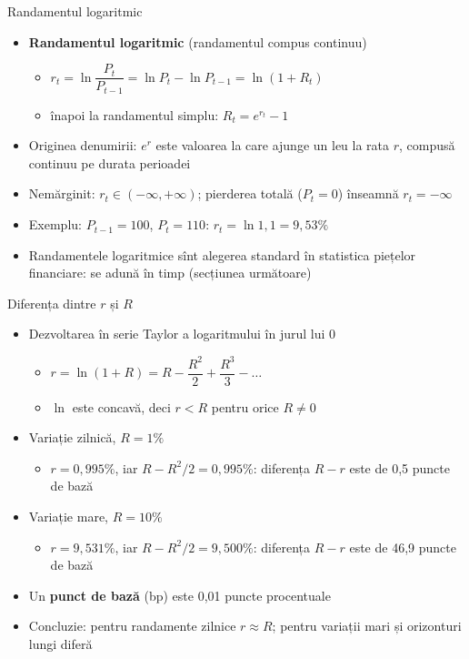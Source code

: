 \begin{frame}{Randamentul logaritmic}
\itemsize{\small}
\begin{itemize}
    \item \textbf{Randamentul logaritmic} (randamentul compus continuu)
    \begin{itemize}
        \item $r_t = \ln\dfrac{P_t}{P_{t-1}} = \ln P_t - \ln P_{t-1} = \ln(1 + R_t)$
        \item înapoi la randamentul simplu: $R_t = e^{r_t} - 1$
    \end{itemize}
    \item Originea denumirii: $e^{r}$ este valoarea la care ajunge un leu la rata $r$, compusă continuu pe durata perioadei
    \item Nemărginit: $r_t \in (-\infty, +\infty)$; pierderea totală ($P_t = 0$) înseamnă $r_t = -\infty$
    \item Exemplu: $P_{t-1} = 100$, $P_t = 110$: $r_t = \ln 1{,}1 = 9{,}53\%$
    \item Randamentele logaritmice sînt alegerea standard în statistica piețelor financiare: se adună în timp (secțiunea următoare)
\end{itemize}
\end{frame}

\begin{frame}{Diferența dintre $r$ și $R$}
\itemsize{\small}
\begin{itemize}
    \item Dezvoltarea în serie Taylor a logaritmului în jurul lui 0
    \begin{itemize}
        \item $r = \ln(1 + R) = R - \dfrac{R^2}{2} + \dfrac{R^3}{3} - \dots$
        \item $\ln$ este concavă, deci $r < R$ pentru orice $R \neq 0$
    \end{itemize}
    \item Variație zilnică, $R = 1\%$
    \begin{itemize}
        \item $r = 0{,}995\%$, iar $R - R^2/2 = 0{,}995\%$: diferența $R - r$ este de 0{,}5 puncte de bază
    \end{itemize}
    \item Variație mare, $R = 10\%$
    \begin{itemize}
        \item $r = 9{,}531\%$, iar $R - R^2/2 = 9{,}500\%$: diferența $R - r$ este de 46{,}9 puncte de bază
    \end{itemize}
    \item Un \textbf{punct de bază} (bp) este 0,01 puncte procentuale
    \item Concluzie: pentru randamente zilnice $r \approx R$; pentru variații mari și orizonturi lungi diferă
\end{itemize}
\end{frame}


